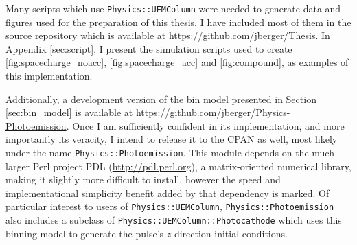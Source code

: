 Many scripts which use \verb!Physics::UEMColumn! were needed to generate data and figures used for the preparation of this thesis.
I have included most of them in the source repository which is available at \url{https://github.com/jberger/Thesis}.
In Appendix \ref{sec:script}, I present the simulation scripts used to create \ref{fig:spacecharge_noacc}, \ref{fig:spacecharge_acc} and \ref{fig:compound}, as examples of this implementation.

Additionally, a development version of the bin model presented in Section \ref{sec:bin_model} is available at \url{https://github.com/jberger/Physics-Photoemission}.
Once I am sufficiently confident in its implementation, and more importantly its veracity, I intend to release it to the CPAN as well, most likely under the name \verb!Physics::Photoemission!.
This module depends on the much larger Perl project PDL (\url{http://pdl.perl.org}), a matrix-oriented numerical library, making it slightly more difficult to install, however the speed and implementational simplicity benefit added by that dependency is marked.
Of particular interest to users of \verb!Physics::UEMColumn!, \verb!Physics::Photoemission! also includes a subclass of \verb!Physics::UEMColumn::Photocathode! which uses this binning model to generate the pulse's $z$ direction initial conditions.


